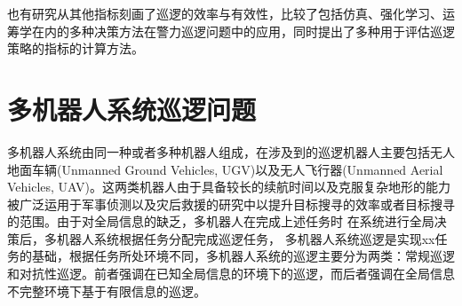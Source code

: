 \documentclass[finalformat,mathCMR]{HUSTthesis}
\begin{document}
也有研究从其他指标刻画了巡逻的效率与有效性，\citep{chenDevelopingOnlineCooperative2017}比较了包括仿真、强化学习、运筹学在内的多种决策方法在警力巡逻问题中的应用，同时提出了多种用于评估巡逻策略的指标的计算方法。



\section{多机器人系统巡逻问题}

多机器人系统由同一种或者多种机器人组成，在涉及到的巡逻机器人主要包括无人地面车辆(Unmanned Ground Vehicles, UGV)以及无人飞行器(Unmanned Aerial Vehicles, UAV)。这两类机器人由于具备较长的续航时间以及克服复杂地形的能力被广泛运用于军事侦测\citep{liuMemeticAlgorithmsOptimal2015, zhuOptimalRoutingLoading2020}以及灾后救援\cite{zhangHelicopterUAVsSearch2022, alitaehMultirobotExplorationTask2022}的研究中以提升目标搜寻的效率或者目标搜寻的范围。由于对全局信息的缺乏，多机器人在完成上述任务时
在系统进行全局决策后，多机器人系统根据任务分配完成巡逻任务，
多机器人系统巡逻是实现xx任务的基础，根据任务所处环境不同，多机器人系统的巡逻主要分为两类：常规巡逻和对抗性巡逻。前者强调在已知全局信息的环境下的巡逻，而后者强调在全局信息不完整环境下基于有限信息的巡逻。
\end{document}
